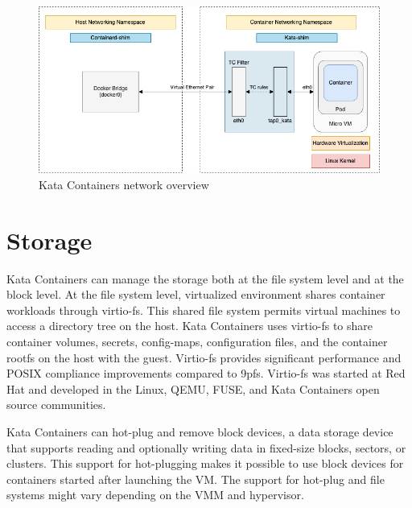 \begin{figure}[ht]
  \begin{center}
    \includegraphics[width=13.5cm]{images/KataContainersNetwork.png}
    \caption{Kata Containers network overview \cite{KataContainersArchitecture}}
    \label{fig:KataContainersNetwork}
  \end{center}
\end{figure}

\section{Storage}

Kata Containers can manage the storage both at the file system level and at the block level. At the file system level, virtualized environment shares container workloads through virtio-fs. This shared file system permits virtual machines to access a directory tree on the host. Kata Containers uses virtio-fs to share container volumes, secrets, config-maps, configuration files, and the container rootfs on the host with the guest. Virtio-fs provides significant performance and POSIX compliance improvements compared to 9pfs. Virtio-fs was started at Red Hat and developed in the Linux, QEMU, FUSE, and Kata Containers open source communities. \cite{virtio-fs-Kata}\cite{virtio-fs}

Kata Containers can hot-plug and remove block devices, a data storage device that supports reading and optionally writing data in fixed-size blocks, sectors, or clusters. This support for hot-plugging makes it possible to use block devices for containers started after launching the VM. The support for hot-plug and file systems might vary depending on the VMM and hypervisor. \cite{KataContainersArchitecture}\cite{KataContainersVirtualization}


